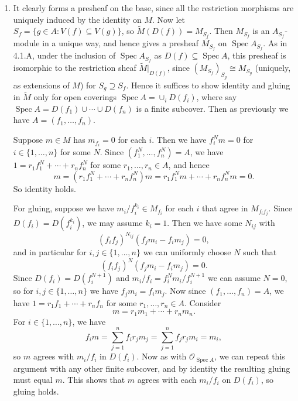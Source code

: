 \documentclass{report}
\newcommand{\shMod}[1]{\widetilde{#1}} %
\renewcommand{\O}{\mathscr{O}} %
\DeclareMathOperator{\Spec}{Spec}
\begin{document}
\begin{enumerate}[label=\textbf{4.1.\Alph*.}]
	\item It clearly forms a presheaf on the base, since all the restriction
	      morphisms are uniquely induced by the identity on $M$. Now let
	      $S_f=\{g\in A:V(f)\subseteq V(g)\}$, so $\shMod M(D(f))=M_{S_f}$.
	      Then $M_{S_f}$ is an $A_{S_f}$-module in a unique way, and hence gives a
	      presheaf $\shMod{M_{S_f}}$ on $\Spec A_{S_f}$. As in 4.1.A, under
	      the inclusion of $\Spec A_{S_f}$ as $D(f)\subseteq\Spec A$, this
	      presheaf is isomorphic to the restriction sheaf $\shMod M|_{D(f)}$,
	      since $(M_{S_f})_{S_g}\cong M_{S_g}$ (uniquely, as extensions of $M$)
	      for $S_g\supseteq S_f$. Hence it suffices to show identity and gluing in
	      $\shMod M$ only for open coverings $\Spec A=\cup_iD(f_i)$, where say
	      $\Spec A=D(f_1)\cup\cdots\cup D(f_n)$  is a finite subcover. Then as
	      previously we have $A=(f_1,\ldots,f_n)$.

	      Suppose $m\in M$ has $m_{f_i}=0$ for each $i$. Then we have $f_i^Nm=0$
	      for $i\in\{1,\ldots,n\}$ for some $N$. Since $(f_1^N,\ldots,f_n^N)=A$,
	      we have $1=r_1f_1^N+\cdots+r_nf_n^N$ for some $r_1,\ldots,r_n\in A$, and
	      hence
	      \begin{equation*}
		      m = (r_1f_1^N+\cdots+r_nf_n^N)m = r_1f_1^Nm + \cdots + r_nf_n^Nm = 0.
	      \end{equation*}
	      So identity holds.

	      For gluing, suppose we have $m_i/f_i^{k_i}\in M_{f_i}$ for each $i$ that
	      agree in $M_{f_if_j}$. Since $D(f_i)=D(f_i^{k_i})$, we may assume
	      $k_i=1$. Then we have some $N_{ij}$ with
	      \begin{equation*}
		      (f_if_j)^{N_{ij}}(f_jm_i-f_im_j) = 0,
	      \end{equation*}
	      and in particular for $i,j\in\{1,\ldots,n\}$ we can uniformly choose $N$
	      such that
	      \begin{equation*}
		      (f_if_j)^N(f_jm_i-f_im_j) = 0.
	      \end{equation*}
	      Since $D(f_i)=D(f_i^{N+1})$ and $m_i/f_i=f_i^{N}m_i/f_i^{N+1}$ we can
	      assume $N=0$, so for $i,j\in\{1,\ldots,n\}$ we have $f_jm_i=f_im_j$.
	      Now since $(f_1,\ldots,f_n)=A$, we have $1=r_1f_1+\cdots+r_nf_n$ for
	      some $r_1,\ldots,r_n\in A$. Consider
	      \begin{equation*}
		      m = r_1m_1 + \cdots + r_nm_n.
	      \end{equation*}
	      For $i\in\{1,\ldots,n\}$, we have
	      \begin{equation*}
		      f_im = \sum_{j=1}^nf_ir_jm_j = \sum_{j=1}^nf_jr_jm_i = m_i,
	      \end{equation*}
	      so $m$ agrees with $m_i/f_i$ in $D(f_i)$. Now as with $\O_{\Spec A}$, we
	      can repeat this argument with any other finite subcover, and by identity
	      the resulting gluing must equal $m$. This shows that $m$ agrees with
	      each $m_i/f_i$ on $D(f_i)$, so gluing holds.


\end{enumerate}
\end{document}
